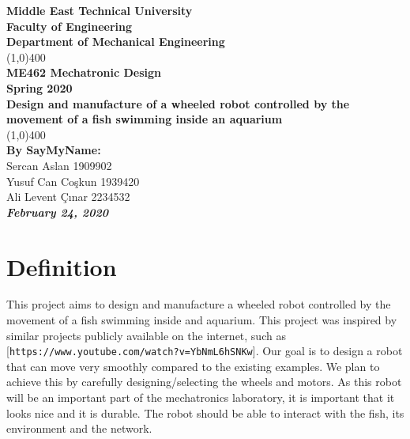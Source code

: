\documentclass[12pt]{article}
\begin{document}
	
	\begin{titlepage}
		\begin{center}
			\vspace*{1cm}
			\Large{\textbf{Middle East Technical University}\\
				\Large{\textbf{Faculty of Engineering}}\\
				\Large{\textbf{Department of Mechanical Engineering}}\\
				\line(1,0){400}\\[1mm]
				\huge{\textbf{ME462 Mechatronic Design\\ Spring 2020}}\\[3mm]
				\Large{\textbf{Design and manufacture of a wheeled robot controlled by the movement of a fish swimming inside an aquarium}}\\[1mm]
				\line(1,0){400}\\
				\vfill
				\textbf{By SayMyName:}\\
				Sercan Aslan  1909902\\
				Yusuf Can Coşkun  1939420\\
				Ali Levent Çınar  2234532\\
				\slshape {\textbf {February 24, 2020}}}\\
		\end{center}
	\end{titlepage}
	\tableofcontents
	\cleardoublepage
	\section{Definition}
	This project aims to design and manufacture a wheeled robot controlled by the movement of a fish swimming inside and aquarium. This project was inspired by similar projects publicly available on the internet, such as [\texttt{https://www.youtube.com/watch?v=YbNmL6hSNKw}]. Our goal is to design a robot that can move very smoothly compared to the existing examples. We plan to achieve this by carefully designing/selecting the wheels and motors. As this robot will be an important part of the mechatronics laboratory, it is important that it looks nice and it is durable. The robot should be able to interact with the fish, its environment and the network.
\end{document}
